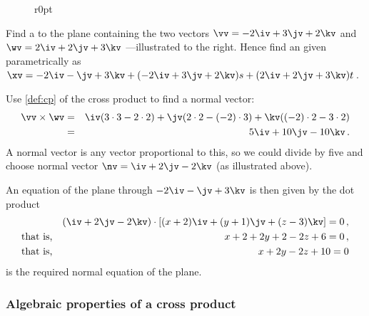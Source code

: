 \begin{figure}r{0pt}
\end{figure}
\begin{example} \label{eg:cpnvp}
Find a  to the plane containing the two vectors \(\vv=-2\iv+3\jv+2\kv\) and \(\wv=2\iv+2\jv+3\kv\) ---illustrated to the right.
Hence find an  given parametrically as \(\xv=-2\iv-\jv+3\kv+(-2\iv+3\jv+2\kv)s+(2\iv+2\jv+3\kv)t\)\,.
%

\begin{solution} 
Use \cref{def:cp} of the cross product to find a normal vector:
\begin{eqnarray*}
\vv\times\wv&=&
\iv(3\cdot 3-2\cdot 2)
+\jv(2\cdot 2-(-2)\cdot 3)
+\kv((-2)\cdot 2-3\cdot 2)
\\&=&5\iv+10\jv-10\kv\,.
\end{eqnarray*}
A normal vector is any vector proportional to this, so we could divide by five and choose normal vector \(\nv=\iv+2\jv-2\kv\) (as illustrated above).

An equation of the plane through \(-2\iv-\jv+3\kv\) is then given by the dot product
\begin{eqnarray*}
&&(\iv+2\jv-2\kv)\cdot[(x+2)\iv+(y+1)\jv+(z-3)\kv]=0\,,
\\\text{that is,}&& x+2+2y+2-2z+6=0\,,
\\\text{that is,}&& x+2y-2z+10=0
\end{eqnarray*}
is the required normal equation of the plane.
\aqed
\end{solution}
\end{example}




\subsubsection{Algebraic properties of a cross product}

